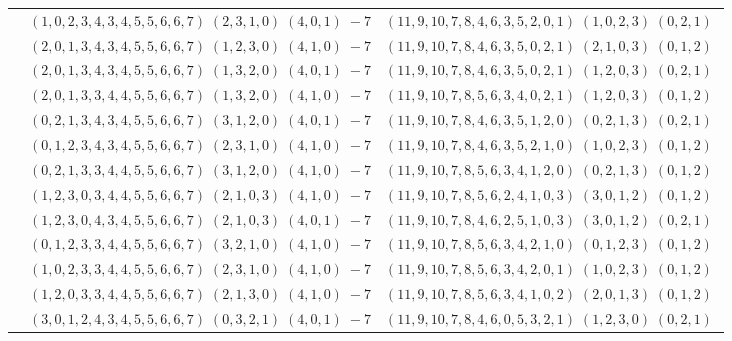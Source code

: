 \documentclass[11pt]{article}
\begin{document}
\begin{longtable}[l]{|c|c|c|}
 \cline{2-3} 
 & $(1 ,0 ,2 ,3 ,4 ,3 ,4 ,5 ,5 ,6 ,6 ,7) \;(2 ,3 ,1 ,0) \;(4 ,0 ,1) \;-7$ & $(11 ,9 ,10 ,7 ,8 ,4 ,6 ,3 ,5 ,2 ,0 ,1) \;(1 ,0 ,2 ,3) \;(0 ,2 ,1) \;$\\ 
 \cline{2-3} 
 & $(2 ,0 ,1 ,3 ,4 ,3 ,4 ,5 ,5 ,6 ,6 ,7) \;(1 ,2 ,3 ,0) \;(4 ,1 ,0) \;-7$ & $(11 ,9 ,10 ,7 ,8 ,4 ,6 ,3 ,5 ,0 ,2 ,1) \;(2 ,1 ,0 ,3) \;(0 ,1 ,2) \;$\\ 
 \cline{2-3} 
 & $(2 ,0 ,1 ,3 ,4 ,3 ,4 ,5 ,5 ,6 ,6 ,7) \;(1 ,3 ,2 ,0) \;(4 ,0 ,1) \;-7$ & $(11 ,9 ,10 ,7 ,8 ,4 ,6 ,3 ,5 ,0 ,2 ,1) \;(1 ,2 ,0 ,3) \;(0 ,2 ,1) \;$\\ 
 \cline{2-3} 
 & $(2 ,0 ,1 ,3 ,3 ,4 ,4 ,5 ,5 ,6 ,6 ,7) \;(1 ,3 ,2 ,0) \;(4 ,1 ,0) \;-7$ & $(11 ,9 ,10 ,7 ,8 ,5 ,6 ,3 ,4 ,0 ,2 ,1) \;(1 ,2 ,0 ,3) \;(0 ,1 ,2) \;$\\ 
 \cline{2-3} 
 & $(0 ,2 ,1 ,3 ,4 ,3 ,4 ,5 ,5 ,6 ,6 ,7) \;(3 ,1 ,2 ,0) \;(4 ,0 ,1) \;-7$ & $(11 ,9 ,10 ,7 ,8 ,4 ,6 ,3 ,5 ,1 ,2 ,0) \;(0 ,2 ,1 ,3) \;(0 ,2 ,1) \;$\\ 
 \cline{2-3} 
 & $(0 ,1 ,2 ,3 ,4 ,3 ,4 ,5 ,5 ,6 ,6 ,7) \;(2 ,3 ,1 ,0) \;(4 ,1 ,0) \;-7$ & $(11 ,9 ,10 ,7 ,8 ,4 ,6 ,3 ,5 ,2 ,1 ,0) \;(1 ,0 ,2 ,3) \;(0 ,1 ,2) \;$\\ 
 \cline{2-3} 
 & $(0 ,2 ,1 ,3 ,3 ,4 ,4 ,5 ,5 ,6 ,6 ,7) \;(3 ,1 ,2 ,0) \;(4 ,1 ,0) \;-7$ & $(11 ,9 ,10 ,7 ,8 ,5 ,6 ,3 ,4 ,1 ,2 ,0) \;(0 ,2 ,1 ,3) \;(0 ,1 ,2) \;$\\ 
 \cline{2-3} 
 & $(1 ,2 ,3 ,0 ,3 ,4 ,4 ,5 ,5 ,6 ,6 ,7) \;(2 ,1 ,0 ,3) \;(4 ,1 ,0) \;-7$ & $(11 ,9 ,10 ,7 ,8 ,5 ,6 ,2 ,4 ,1 ,0 ,3) \;(3 ,0 ,1 ,2) \;(0 ,1 ,2) \;$\\ 
 \cline{2-3} 
 & $(1 ,2 ,3 ,0 ,4 ,3 ,4 ,5 ,5 ,6 ,6 ,7) \;(2 ,1 ,0 ,3) \;(4 ,0 ,1) \;-7$ & $(11 ,9 ,10 ,7 ,8 ,4 ,6 ,2 ,5 ,1 ,0 ,3) \;(3 ,0 ,1 ,2) \;(0 ,2 ,1) \;$\\ 
 \cline{2-3} 
 & $(0 ,1 ,2 ,3 ,3 ,4 ,4 ,5 ,5 ,6 ,6 ,7) \;(3 ,2 ,1 ,0) \;(4 ,1 ,0) \;-7$ & $(11 ,9 ,10 ,7 ,8 ,5 ,6 ,3 ,4 ,2 ,1 ,0) \;(0 ,1 ,2 ,3) \;(0 ,1 ,2) \;$\\ 
 \cline{2-3} 
 & $(1 ,0 ,2 ,3 ,3 ,4 ,4 ,5 ,5 ,6 ,6 ,7) \;(2 ,3 ,1 ,0) \;(4 ,1 ,0) \;-7$ & $(11 ,9 ,10 ,7 ,8 ,5 ,6 ,3 ,4 ,2 ,0 ,1) \;(1 ,0 ,2 ,3) \;(0 ,1 ,2) \;$\\ 
 \cline{2-3} 
 & $(1 ,2 ,0 ,3 ,3 ,4 ,4 ,5 ,5 ,6 ,6 ,7) \;(2 ,1 ,3 ,0) \;(4 ,1 ,0) \;-7$ & $(11 ,9 ,10 ,7 ,8 ,5 ,6 ,3 ,4 ,1 ,0 ,2) \;(2 ,0 ,1 ,3) \;(0 ,1 ,2) \;$\\ 
 \cline{2-3} 
 & $(3 ,0 ,1 ,2 ,4 ,3 ,4 ,5 ,5 ,6 ,6 ,7) \;(0 ,3 ,2 ,1) \;(4 ,0 ,1) \;-7$ & $(11 ,9 ,10 ,7 ,8 ,4 ,6 ,0 ,5 ,3 ,2 ,1) \;(1 ,2 ,3 ,0) \;(0 ,2 ,1) \;$\\ 

\end{longtable}
\end{document}
